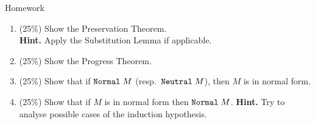 %

\begin{frame}{Homework}
  \begin{enumerate}
    \item (25\%) Show the Preservation Theorem. \\
      \textbf{Hint.} Apply the Substitution Lemma if applicable. 
    \item (25\%) Show the Progress Theorem.
    \item (25\%) Show that if $\mathtt{Normal}\;M$ (resp.\ $\mathtt{Neutral}\;M$), then $M$ is in
      normal form. 
    \item (25\%) Show that if $M$ is in normal form then $\mathtt{Normal}\;M$.
      \textbf{Hint.} Try to analyse possible cases of the induction hypothesis.
  \end{enumerate}
  
\end{frame}

%
%
% 
%


